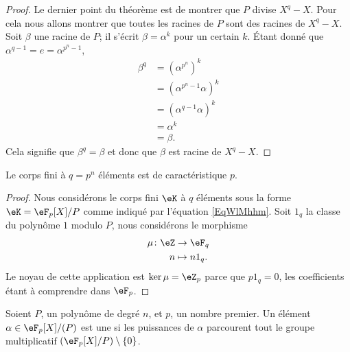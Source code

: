 \begin{proof}
	Le dernier point du théorème est de montrer que \( P\) divise \( X^q-X\). Pour cela nous allons montrer que toutes les racines de \( P\) sont des racines de \( X^q-X\). Soit \( \beta\) une racine de \( P\); il s'écrit \( \beta=\alpha^k\) pour un certain \( k\). Étant donné que \( \alpha^{q-1}=e=\alpha^{p^n-1}\),
	\begin{subequations}
		\begin{align}
			\beta^q & =(\alpha^{p^n})^k                      \\
			        & =\left( \alpha^{p^n-1}\alpha \right)^k \\
			        & =\left( \alpha^{q-1}\alpha \right)^k   \\
			        & =\alpha^k                              \\
			        & =\beta.
		\end{align}
	\end{subequations}
	Cela signifie que \( \beta^q=\beta\) et donc que \( \beta\) est racine de \( X^q-X\).
\end{proof}

\begin{corollary}
	Le corps fini à \( q=p^n\) éléments est de caractéristique \( p\).
\end{corollary}

\begin{proof}
	Nous considérons le corps fini \( \eK\) à \( q\) éléments sous la forme \( \eK=\eF_p[X]/P\) comme indiqué par l'équation \eqref{EqWlMhhm}. Soit \( 1_q\) la classe du polynôme \( 1\) modulo \( P\), nous considérons le morphisme
	\begin{equation}
		\begin{aligned}
			\mu\colon \eZ & \to \eF_q     \\
			n             & \mapsto n1_q.
		\end{aligned}
	\end{equation}
	Le noyau de cette application est \( \ker\mu=\eZ_p\) parce que \( p1_q=0\), les coefficients étant à comprendre dans \( \eF_p\).
\end{proof}

\begin{definition}  \label{DefnPNCFO}
	Soient \( P\), un polynôme de degré \( n\), et \( p\), un nombre premier. Un élément \( \alpha\in \eF_p[X]/(P)\) est une  si les puissances de \( \alpha\) parcourent tout le groupe multiplicatif \( (\eF_p[X]/P)\setminus\{ 0 \}\).
\end{definition}

